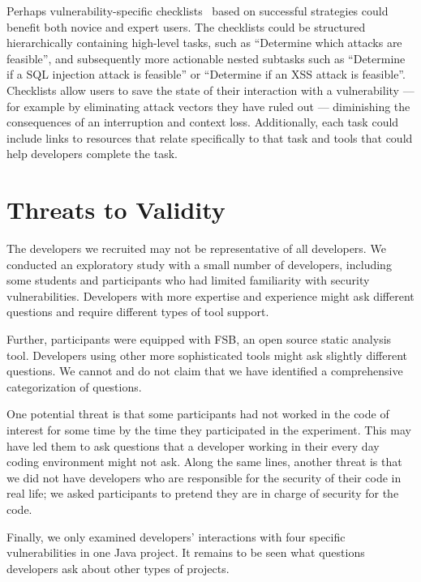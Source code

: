 \documentclass{acm_proc_article-sp}
\begin{document}
Perhaps vulnerability-specific checklists~\cite{phang2009triaging} based on successful strategies could benefit both novice and expert users.
The checklists could be structured hierarchically containing high-level tasks, such as 	``Determine which attacks are feasible'', and subsequently more actionable nested subtasks such as ``Determine if a SQL injection attack is feasible'' or ``Determine if an XSS attack is feasible''.
Checklists allow users to save the state of their interaction with a vulnerability --- for example by eliminating attack vectors they have ruled out --- diminishing the consequences of an interruption and context loss.
Additionally, each task could include links to resources that relate specifically to that task and tools that could help developers complete the task.

\section{Threats to Validity}
\label{limits}
The developers we recruited may not be representative of all developers.
We conducted an exploratory study with a small number of developers, including some students and participants who had limited familiarity with security vulnerabilities.
Developers with more expertise and experience might ask different questions and require different types of tool support.

Further, participants were equipped with FSB, an open source static analysis tool. 
Developers using other more sophisticated tools might ask slightly different questions.
We cannot and do not claim that we have identified a comprehensive categorization of questions.

One potential threat is that some participants had not worked in the code of interest for some time by the time they participated in the experiment. This may have led them to ask questions that a developer working in their every day coding environment might not ask. 
Along the same lines, another threat is that we did not have developers who are responsible for the security of their code in real life; we asked participants to pretend they are in charge of security for the code.  

Finally, we only examined developers' interactions with four specific vulnerabilities in one Java project. 
It remains to be seen what questions developers ask about other types of projects.
\end{document}
